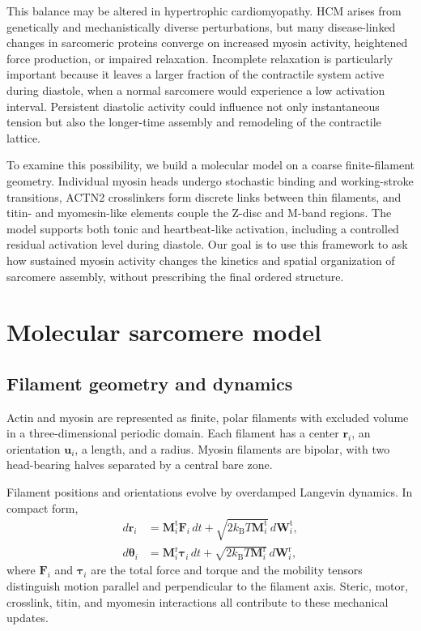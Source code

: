 \documentclass[11pt]{article}
\begin{document}
This balance may be altered in hypertrophic cardiomyopathy. HCM arises from
genetically and mechanistically diverse perturbations, but many disease-linked
changes in sarcomeric proteins converge on increased myosin activity,
heightened force production, or impaired relaxation. Incomplete relaxation is
particularly important because it leaves a larger fraction of the contractile
system active during diastole, when a normal sarcomere would experience a low
activation interval. Persistent diastolic activity could influence not only
instantaneous tension but also the longer-time assembly and remodeling of the
contractile lattice. %

To examine this possibility, we build a molecular model on a coarse
finite-filament geometry. Individual myosin heads undergo stochastic binding
and working-stroke transitions, ACTN2 crosslinkers form discrete links between
thin filaments, and titin- and myomesin-like elements couple the Z-disc and
M-band regions. The model supports both tonic and heartbeat-like activation,
including a controlled residual activation level during diastole. Our goal is
to use this framework to ask how sustained myosin activity changes the
kinetics and spatial organization of sarcomere assembly, without prescribing
the final ordered structure.


\section{Molecular sarcomere model}

\subsection{Filament geometry and dynamics}

Actin and myosin are represented as finite, polar filaments with excluded
volume in a three-dimensional periodic domain. Each filament has a center
$\bm r_i$, an orientation $\bm u_i$, a length, and a radius. Myosin filaments
are bipolar, with two head-bearing halves separated by a central bare zone.

Filament positions and orientations evolve by overdamped Langevin dynamics.
In compact form,
\begin{align}
  d\bm r_i &= \bm M_i^{\mathrm t}\bm F_i\,dt
  + \sqrt{2k_{\mathrm B}T\bm M_i^{\mathrm t}}\,d\bm W_i^{\mathrm t},\\
  d\bm\theta_i &= \bm M_i^{\mathrm r}\bm\tau_i\,dt
  + \sqrt{2k_{\mathrm B}T\bm M_i^{\mathrm r}}\,d\bm W_i^{\mathrm r},
\end{align}
where $\bm F_i$ and $\bm\tau_i$ are the total force and torque and the mobility
tensors distinguish motion parallel and perpendicular to the filament axis.
Steric, motor, crosslink, titin, and myomesin interactions all contribute to
these mechanical updates.
\end{document}
